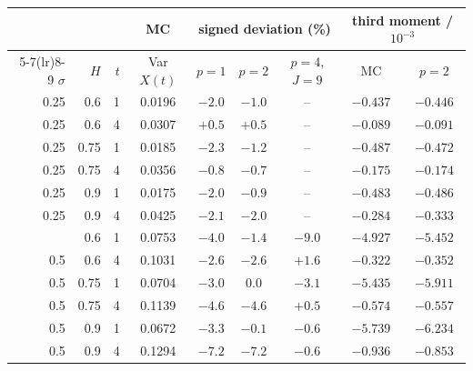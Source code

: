 \begin{tabular}{rrrcccccc}\toprule
 & & & MC & \multicolumn{3}{c}{signed deviation (\%)} & \multicolumn{2}{c}{third moment / $10^{-3}$}\\\cmidrule(lr){5-7}\cmidrule(lr){8-9}
$\sigma$ & $H$ & $t$ & Var $X(t)$ & $p=1$ & $p=2$ & $p=4$, $J=9$ & MC & $p=2$\\\midrule
0.25 & 0.6 & 1 & 0.0196 & $-2.0$ & $-1.0$ & -- & $-0.437$ & $-0.446$\\
0.25 & 0.6 & 4 & 0.0307 & $+0.5$ & $+0.5$ & -- & $-0.089$ & $-0.091$\\
0.25 & 0.75 & 1 & 0.0185 & $-2.3$ & $-1.2$ & -- & $-0.487$ & $-0.472$\\
0.25 & 0.75 & 4 & 0.0356 & $-0.8$ & $-0.7$ & -- & $-0.175$ & $-0.174$\\
0.25 & 0.9 & 1 & 0.0175 & $-2.0$ & $-0.9$ & -- & $-0.483$ & $-0.486$\\
0.25 & 0.9 & 4 & 0.0425 & $-2.1$ & $-2.0$ & -- & $-0.284$ & $-0.333$\\
\addlinespace
0.5 & 0.6 & 1 & 0.0753 & $-4.0$ & $-1.4$ & $-9.0$ & $-4.927$ & $-5.452$\\
0.5 & 0.6 & 4 & 0.1031 & $-2.6$ & $-2.6$ & $+1.6$ & $-0.322$ & $-0.352$\\
0.5 & 0.75 & 1 & 0.0704 & $-3.0$ & $0.0$ & $-3.1$ & $-5.435$ & $-5.911$\\
0.5 & 0.75 & 4 & 0.1139 & $-4.6$ & $-4.6$ & $+0.5$ & $-0.574$ & $-0.557$\\
0.5 & 0.9 & 1 & 0.0672 & $-3.3$ & $-0.1$ & $-0.6$ & $-5.739$ & $-6.234$\\
0.5 & 0.9 & 4 & 0.1294 & $-7.2$ & $-7.2$ & $-0.6$ & $-0.936$ & $-0.853$\\
\bottomrule\end{tabular}
